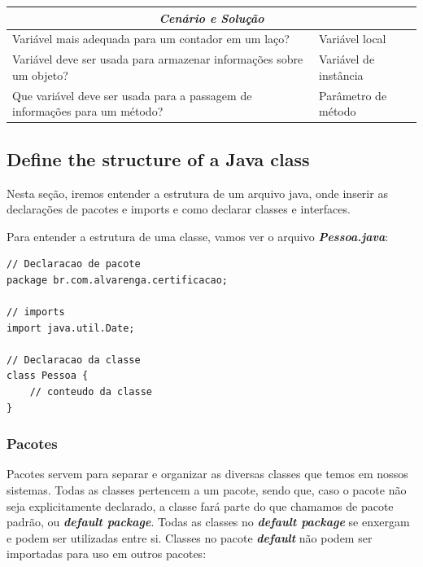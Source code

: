 \documentclass[12pt]{article}
\begin{document}
\begin{table}[H]
	\begin{tabular}{|ll|}
		\hline
		\multicolumn{2}{|c|}{\cellcolor[HTML]{34FF34}\textit{\textbf{Cenário e Solução}}}                                        \\ \hline
		\multicolumn{1}{|l|}{Variável mais adequada para um contador em um laço?}                        & Variável local        \\ \hline
		\multicolumn{1}{|l|}{Variável deve ser usada para armazenar informações sobre um objeto?}        & Variável de instância \\ \hline
		\multicolumn{1}{|l|}{Que variável deve ser usada para a passagem de informações para um método?} & Parâmetro de método   \\ \hline
	\end{tabular}
\end{table}

\subsection{Define the structure of a Java class}

Nesta seção, iremos entender a estrutura de um arquivo java, onde inserir as declarações de pacotes e imports e como declarar classes e interfaces.

Para entender a estrutura de uma classe, vamos ver o arquivo \textbf{\textit{Pessoa.java}}:

\begin{lstlisting}
// Declaracao de pacote
package br.com.alvarenga.certificacao;
	
// imports
import java.util.Date;
	
// Declaracao da classe
class Pessoa {
	// conteudo da classe
}
\end{lstlisting}

\subsubsection{Pacotes}

Pacotes servem para separar e organizar as diversas classes que temos em nossos sistemas. Todas as classes pertencem a um pacote, sendo que, caso o pacote não seja explicitamente declarado, a classe fará parte do que chamamos de pacote padrão, ou \textbf{\textit{default package}}. Todas as classes no \textbf{\textit{default package}} se enxergam e podem ser utilizadas entre si. Classes no pacote \textbf{\textit{default}} não podem ser importadas para uso em outros pacotes:
\end{document}
